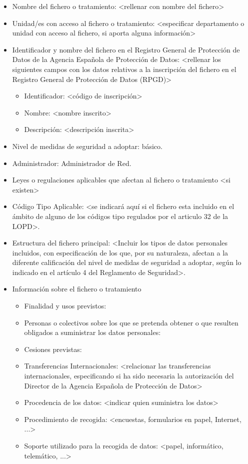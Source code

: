 \documentclass[a4paper,11pt,bibtotoc,noliststotoc]{scrbook}
\begin{document}
\begin{itemize}
\item Nombre del fichero o tratamiento: <rellenar con nombre del fichero>

\item Unidad/es con acceso al fichero o tratamiento: <especificar departamento o unidad con acceso al fichero, si aporta alguna información>

\item Identificador y nombre del fichero en el Registro General de Protección de Datos de la Agencia Española de Protección de Datos: <rellenar los siguientes campos con los datos relativos a la inscripción del fichero en el Registro General de Protección de Datos (RPGD)>
	\begin{itemize}
	\item Identificador: <código de inscripción>
	\item Nombre: <nombre inscrito>
	\item Descripción: <descripción inscrita>
	\end{itemize}

\item Nivel de medidas de seguridad a adoptar: básico.

\item Administrador: Administrador de Red.

\item Leyes o regulaciones aplicables que afectan al fichero o tratamiento <si existen>

\item Código Tipo Aplicable: <se indicará aquí si el fichero esta incluido en el ámbito de alguno de los códigos tipo regulados por el articulo 32 de la LOPD>.

\item Estructura del fichero principal: <Incluir los tipos de datos personales incluidos, con especificación de los que, por su naturaleza, afectan a la diferente calificación del nivel de medidas de seguridad a adoptar, según lo indicado en el artículo 4 del Reglamento de Seguridad>.

\item Información sobre el fichero o tratamiento
	\begin{itemize}
	\item Finalidad y usos previstos:
	\item Personas o colectivos sobre los que se pretenda obtener o que resulten obligados a suministrar los datos personales:
	\item Cesiones previstas:
	\item Transferencias Internacionales: <relacionar las transferencias internacionales, especificando si ha sido necesaria la autorización del Director de la Agencia Española de Protección de Datos>
	\item Procedencia de los datos: <indicar quien suministra los datos>
	\item Procedimiento de recogida: <encuestas, formularios en papel, Internet, ...>
	\item Soporte utilizado para la recogida de datos: <papel, informático, telemático, ...>
	\end{itemize}


\end{itemize}
\end{document}
